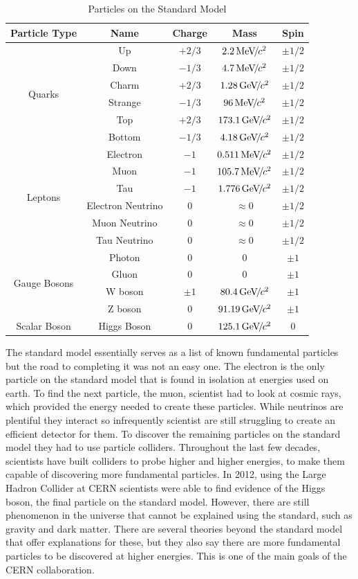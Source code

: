 \begin{table}
\caption{Particles on the Standard Model}
\label{tab:particles}
\begin{center}
\begin{tabular}{|c|c|c|c|c|}
\hline
Particle Type & Name & Charge & Mass & Spin \\
\hline
\multirow{6}{*}{Quarks} & Up & $+2/3$ & $2.2{\,\text{Me\hspace{-.08em}V\hspace{-0.16em}/\hspace{-0.08em}}c^\text{2}}$ & $\pm 1/2$ \\
& Down & $-1/3$ & $4.7{\,\text{Me\hspace{-.08em}V\hspace{-0.16em}/\hspace{-0.08em}}c^\text{2}}$ & $\pm 1/2$ \\
& Charm & $+2/3$ & $1.28{\,\text{Ge\hspace{-.08em}V\hspace{-0.16em}/\hspace{-0.08em}}c^\text{2}}$ & $\pm 1/2$ \\
& Strange & $-1/3$ & $96{\,\text{Me\hspace{-.08em}V\hspace{-0.16em}/\hspace{-0.08em}}c^\text{2}}$ & $\pm 1/2$ \\
& Top & $+2/3$ & $173.1{\,\text{Ge\hspace{-.08em}V\hspace{-0.16em}/\hspace{-0.08em}}c^\text{2}}$ & $\pm 1/2$ \\
& Bottom & $-1/3$ & $4.18{\,\text{Ge\hspace{-.08em}V\hspace{-0.16em}/\hspace{-0.08em}}c^\text{2}}$ & $\pm 1/2$ \\
\hline
\multirow{6}{*}{Leptons} & Electron & $-1$ & $0.511{\,\text{Me\hspace{-.08em}V\hspace{-0.16em}/\hspace{-0.08em}}c^\text{2}}$ & $\pm 1/2$ \\
& Muon & $-1$ & $105.7{\,\text{Me\hspace{-.08em}V\hspace{-0.16em}/\hspace{-0.08em}}c^\text{2}}$ & $\pm 1/2$ \\
& Tau & $-1$ & $1.776{\,\text{Ge\hspace{-.08em}V\hspace{-0.16em}/\hspace{-0.08em}}c^\text{2}}$ & $\pm 1/2$ \\
& Electron Neutrino & $0$ & $\approx 0$ & $\pm 1/2$ \\
& Muon Neutrino & $0$ & $\approx 0$ & $\pm 1/2$ \\
& Tau Neutrino & $0$ & $\approx 0$ & $\pm 1/2$ \\
\hline
\multirow{4}{*}{Gauge Bosons} & Photon & 0 & 0 & $\pm 1$ \\
& Gluon & 0 & 0 & $\pm 1$ \\
& W boson & $\pm 1$ & $80.4{\,\text{Ge\hspace{-.08em}V\hspace{-0.16em}/\hspace{-0.08em}}c^\text{2}}$ & $\pm 1$ \\
& Z boson & 0 & $91.19{\,\text{Ge\hspace{-.08em}V\hspace{-0.16em}/\hspace{-0.08em}}c^\text{2}}$ & $\pm 1$ \\
\hline
Scalar Boson & Higgs Boson & 0 & $125.1{\,\text{Ge\hspace{-.08em}V\hspace{-0.16em}/\hspace{-0.08em}}c^\text{2}}$ & 0 \\
\hline
\end{tabular}
\end{center}
\end{table} 
The standard model essentially serves as a list of known fundamental particles but the road to completing it was not an easy one. The electron is the only particle on the standard model that is found in isolation at energies used on earth. To find the next particle, the muon, scientist had to look at cosmic rays, which provided the energy needed to create these particles. While neutrinos are plentiful they interact so infrequently scientist are still struggling to create an efficient detector for them. To discover the remaining particles on the standard model they had to use particle colliders. Throughout the last few decades, scientists have built colliders to probe higher and higher energies, to make them capable of discovering more fundamental particles. In 2012, using the Large Hadron Collider at CERN scientists were able to find evidence of the Higgs boson, the final particle on the standard model. However, there are still phenomenon in the universe that cannot be explained using the standard, such as gravity and dark matter. There are several theories beyond the standard model that offer explanations for these, but they also say there are more fundamental particles to be discovered at higher energies. This is one of the main goals of the CERN collaboration. 

